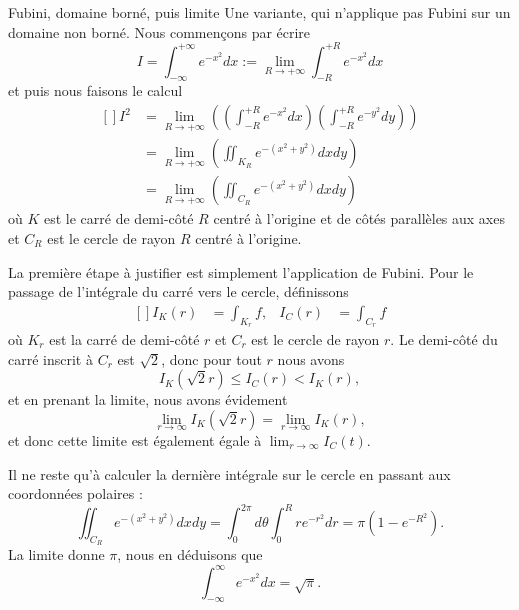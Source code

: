 \begin{example}
\begin{subproof}
        \item[Fubini, domaine borné, puis limite]
    Une variante, qui n'applique pas Fubini sur un domaine non borné. Nous commençons par écrire
\begin{equation}
	I=\int_{-\infty}^{+\infty} e^{-x^2} dx := \lim_{R \to +\infty} \int_{-R}^{+R} e^{-x^2} dx
\end{equation}
et puis nous faisons le calcul
\begin{equation}		\label{EqCalculInteeemoisxcar}
	\begin{aligned}[]
		I^2 &= \lim_{R \to +\infty} \left( (\int_{-R}^{+R} e^{-x^2} dx)( \int_{-R}^{+R} e^{-y^2} dy) \right) \\
		&= \lim_{R \to +\infty} \left( \iint_{K_R}e^{-(x^2+y^2)} dx dy \right) \\
		&= \lim_{R \to +\infty} \left( \iint_{C_R}e^{-(x^2+y^2)} dx dy \right)
	\end{aligned}
\end{equation}
où $K$ est le carré de demi-côté $R$ centré à l'origine et de côtés parallèles aux axes et $C_R$ est le cercle de rayon $R$ centré à l'origine.

	La première étape à justifier est simplement l'application de Fubini. Pour le passage de l'intégrale du carré vers le cercle, définissons
	\begin{equation}
		\begin{aligned}[]
			I_K(r)&=\int_{K_r}f,&I_C(r)&=\int_{C_r}f
		\end{aligned}
	\end{equation}
	où $K_r$ est la carré de demi-côté $r$ et $C_r$ est le cercle de rayon $r$. Le demi-côté du carré inscrit à $C_r$ est $\sqrt{2}$, donc pour tout $r$ nous avons
	\begin{equation}
		I_K(\sqrt{2}r)\leq I_C(r)<I_K(r),
	\end{equation}
	et en prenant la limite, nous avons évidement
	\begin{equation}
		\lim_{r\to \infty}I_K(\sqrt{2}r)=\lim_{r\to\infty}I_K(r),
	\end{equation}
	et donc cette limite est également égale à $\lim_{r\to\infty}I_C(t)$.

    Il ne reste qu'à calculer la dernière intégrale sur le cercle en passant aux coordonnées polaires :
	\begin{equation}
        \iint_{C_R} e^{-(x^2+y^2)}dxdy=\int_0^{2\pi}d\theta\int_0^Rr e^{-r^2}dr=\pi(1- e^{-R^2}).
	\end{equation}
	La limite donne $\pi$, nous en déduisons que
    \begin{equation}    \label{EqFDvHTg}
		\int_{-\infty}^{\infty} e^{-x^2}dx=\sqrt{\pi}.
	\end{equation}
    \end{subproof}

\end{example}


